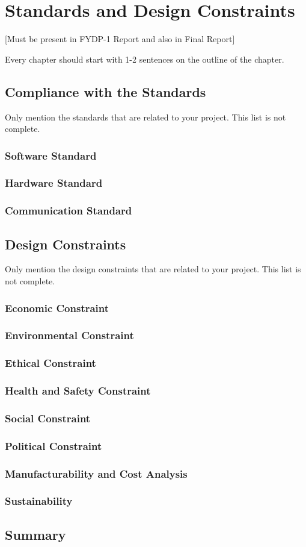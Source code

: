 \chapter{Standards and Design Constraints}
[Must be present in FYDP-1 Report and also in Final Report]

Every chapter should start with 1-2 sentences on the outline of the chapter.

\section{Compliance with the Standards}
Only mention the standards that are related to your project. This list is not complete. 

\subsection{Software Standard}

\subsection{Hardware Standard}

\subsection{Communication Standard}


\section{Design Constraints}
Only mention the design constraints that are related to your project. This list is not complete. 
\subsection{Economic Constraint}
\subsection{Environmental Constraint}
\subsection{Ethical Constraint}
\subsection{Health and Safety Constraint}
\subsection{Social Constraint}
\subsection{Political Constraint}
\subsection{Manufacturability and Cost Analysis}
\subsection{Sustainability}

\section{Summary}